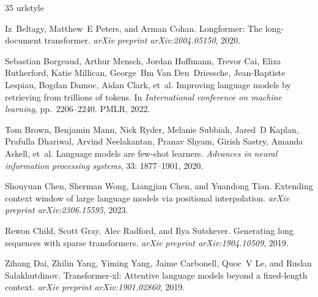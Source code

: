 \documentclass[UTF8,fontset=fandol,a4paper,11pt]{ctexart}
\begin{document}
\begin{thebibliography}{35}
\providecommand{\natexlab}[1]{#1}
\providecommand{\url}[1]{\texttt{#1}}
\expandafter\ifx\csname urlstyle\endcsname\relax
  \providecommand{\doi}[1]{doi: #1}\else
  \providecommand{\doi}{doi: \begingroup \urlstyle{rm}\Url}\fi

Iz~Beltagy, Matthew~E Peters, and Arman Cohan.
\newblock Longformer: The long-document transformer.
\newblock \emph{arXiv preprint arXiv:2004.05150}, 2020.

Sebastian Borgeaud, Arthur Mensch, Jordan Hoffmann, Trevor Cai, Eliza Rutherford, Katie Millican, George~Bm Van Den~Driessche, Jean-Baptiste Lespiau, Bogdan Damoc, Aidan Clark, et~al.
\newblock Improving language models by retrieving from trillions of tokens.
\newblock In \emph{International conference on machine learning}, pp.\  2206--2240. PMLR, 2022.

Tom Brown, Benjamin Mann, Nick Ryder, Melanie Subbiah, Jared~D Kaplan, Prafulla Dhariwal, Arvind Neelakantan, Pranav Shyam, Girish Sastry, Amanda Askell, et~al.
\newblock Language models are few-shot learners.
\newblock \emph{Advances in neural information processing systems}, 33: 1877--1901, 2020.

Shouyuan Chen, Sherman Wong, Liangjian Chen, and Yuandong Tian.
\newblock Extending context window of large language models via positional interpolation.
\newblock \emph{arXiv preprint arXiv:2306.15595}, 2023.

Rewon Child, Scott Gray, Alec Radford, and Ilya Sutskever.
\newblock Generating long sequences with sparse transformers.
\newblock \emph{arXiv preprint arXiv:1904.10509}, 2019.

Zihang Dai, Zhilin Yang, Yiming Yang, Jaime Carbonell, Quoc~V Le, and Ruslan Salakhutdinov.
\newblock Transformer-xl: Attentive language models beyond a fixed-length context.
\newblock \emph{arXiv preprint arXiv:1901.02860}, 2019.


\end{thebibliography}
\end{document}
